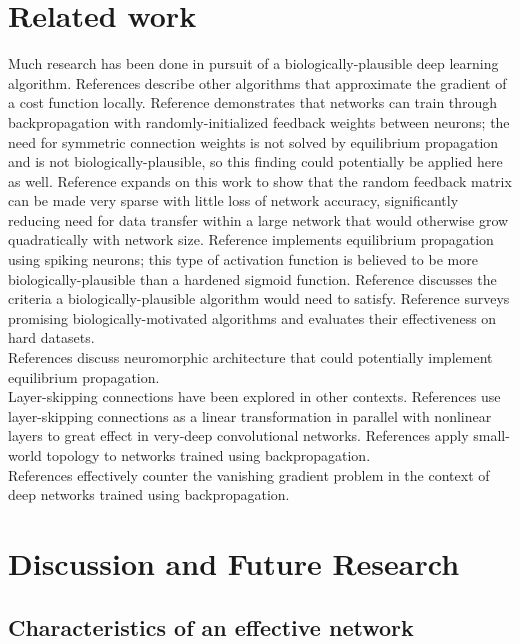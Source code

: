 \documentclass[format=sigconf]{acmart}
\newcommand{\npar}{\\\indent}
\begin{document}
\section{Related work}
Much research has been done in pursuit of a biologically-plausible deep learning algorithm. References \cite{lee2015, xie2003, pineda1987} describe other algorithms that approximate the gradient of a cost function locally. Reference \cite{lillicrap2014} demonstrates that networks can train through backpropagation with randomly-initialized feedback weights between neurons; the need for symmetric connection weights is not solved by equilibrium propagation and is not biologically-plausible, so this finding could potentially be applied here as well. Reference \cite{@crafton2019} expands on this work to show that the random feedback matrix can be made very sparse with little loss of network accuracy, significantly reducing need for data transfer within a large network that would otherwise grow quadratically with network size. Reference \cite{oconnor2018} implements equilibrium propagation using spiking neurons; this type of activation function is believed to be more biologically-plausible than a hardened sigmoid function. Reference \cite{bengio2015} discusses the criteria a biologically-plausible algorithm would need to satisfy. Reference \cite{bartunov2018} surveys promising biologically-motivated algorithms and evaluates their effectiveness on hard datasets.
\npar
References \cite{shainline2019, davies2018, nahmias2013} discuss neuromorphic architecture that could potentially implement equilibrium propagation.
\npar
Layer-skipping connections have been explored in other contexts. References \cite{he2015, srivastava2015} use layer-skipping connections as a linear transformation in parallel with nonlinear layers to great effect in very-deep convolutional networks. References \cite{xiaohu2011, krishnan2019} apply small-world topology to networks trained using backpropagation.
\npar
References \cite{ioffe2015, glorot2010} effectively counter the vanishing gradient problem in the context of deep networks trained using backpropagation.

\section{Discussion and Future Research}

\subsection{Characteristics of an effective network}
\end{document}
